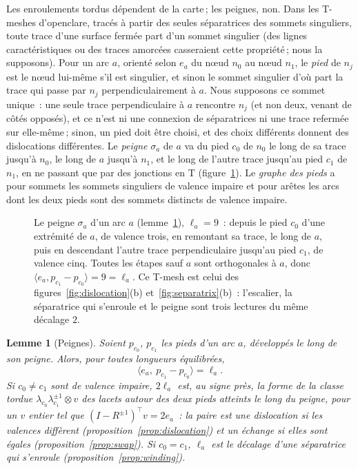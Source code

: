 \documentclass[11pt,a4paper]{article}
\newtheorem{lemma}{Lemme}
\begin{document}
Les enroulements tordus dépendent de la carte\,; les peignes, non. Dans les
T-meshes d'openclare, tracés à partir des seules séparatrices des sommets
singuliers, toute trace d'une surface fermée part d'un sommet singulier (des
lignes caractéristiques ou des traces amorcées casseraient cette propriété\,;
nous la supposons). Pour un arc $a$, orienté selon $e_a$ du nœud $n_0$ au nœud
$n_1$, le \emph{pied} de $n_j$ est le nœud lui-même s'il est singulier, et
sinon le sommet singulier d'où part la trace qui passe par $n_j$
perpendiculairement à $a$. Nous supposons ce sommet unique~: une seule trace
perpendiculaire à $a$ rencontre $n_j$ (et non deux, venant de côtés opposés),
et ce n'est ni une connexion de séparatrices ni une trace refermée sur
elle-même\,; sinon, un pied doit être choisi, et des choix différents donnent
des dislocations différentes. Le \emph{peigne} $\sigma_a$ de $a$ va du pied
$c_0$ de $n_0$ le long de sa trace jusqu'à $n_0$, le long de $a$ jusqu'à
$n_1$, et le long de l'autre trace jusqu'au pied $c_1$ de $n_1$, en ne passant
que par des jonctions en T (figure~\ref{fig:comb}). Le \emph{graphe des pieds}
a pour sommets les sommets singuliers de valence impaire et pour arêtes les
arcs dont les deux pieds sont des sommets distincts de valence impaire.

\begin{figure}[t]
\centering

\caption{Le peigne $\sigma_a$ d'un arc $a$ (lemme~\ref{lem:comb}), $\ell_a =
9$~: depuis le pied $c_0$ d'une extrémité de $a$, de valence trois, en
remontant sa trace, le long de $a$, puis en descendant l'autre trace
perpendiculaire jusqu'au pied $c_1$, de valence cinq. Toutes les étapes sauf
$a$ sont orthogonales à $a$, donc $\langle e_a, p_{c_1} - p_{c_0} \rangle = 9
= \ell_a$. Ce T-mesh est celui des figures~\ref{fig:dislocation}(b)
et~\ref{fig:separatrix}(b)~: l'escalier, la séparatrice qui s'enroule et le
peigne sont trois lectures du même décalage $2$.}
\label{fig:comb}
\end{figure}

\begin{lemma}[Peignes]\label{lem:comb}
Soient $p_{c_0}$, $p_{c_1}$ les pieds d'un arc $a$, développés le long de son
peigne. Alors, pour toutes longueurs équilibrées,
\[
  \langle e_a,\ p_{c_1} - p_{c_0} \rangle = \ell_a .
\]
Si $c_0 \neq c_1$ sont de valence impaire, $2\ell_a$ est, au signe près, la
forme de la classe tordue $\lambda_{c_0}\lambda_{c_1}^{\pm1} \otimes v$ des
lacets autour des deux pieds atteints le long du peigne, pour un $v$ entier
tel que $(I - R^{\pm1})^\top v = 2e_a$~: la paire est une dislocation si les
valences diffèrent (proposition~\ref{prop:dislocation}) et un échange si elles
sont égales (proposition~\ref{prop:swap}). Si $c_0 = c_1$, $\ell_a$ est le
décalage d'une séparatrice qui s'enroule (proposition~\ref{prop:winding}).
\end{lemma}
\end{document}
